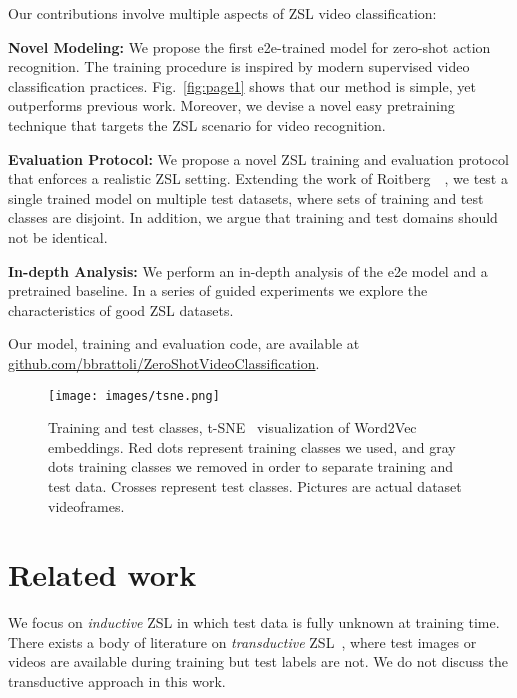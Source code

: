 \documentclass[10pt,twocolumn,letterpaper]{article}
\begin{document}
Our contributions involve multiple aspects of ZSL video classification:
\begin{compactenum}
  \item[\textbf{Novel Modeling:}] We propose the first e2e-trained model for zero-shot action recognition. The training procedure is inspired by modern supervised video classification practices. Fig.~\ref{fig:page1} shows that our method is simple, yet outperforms previous work. Moreover, we devise a novel easy pretraining technique that targets the ZSL scenario for video recognition.
  \item[\textbf{Evaluation Protocol:}] We propose a novel ZSL training and evaluation protocol that enforces a realistic ZSL setting. Extending the work of Roitberg~\etal~\cite{roitberg2018towards}, we test a single trained model on multiple test datasets, where sets of training and test classes are disjoint. In addition, we argue that training and test domains should not be identical.
  \item[\textbf{In-depth Analysis:}] We perform an in-depth analysis of the e2e model and a pretrained baseline. In a series of guided experiments we explore the characteristics of good ZSL datasets.
\end{compactenum}

Our model, training and evaluation code, are available at \textcolor{blue}{\href{https://github.com/bbrattoli/ZeroShotVideoClassification}{github.com/bbrattoli/ZeroShotVideoClassification}}.

\begin{figure}
\centering
\texttt{[image: images/tsne.png]}
\caption{Training and test classes, t-SNE~\cite{tsne} visualization of Word2Vec embeddings. Red dots represent training classes we used, and gray dots training classes we removed in order to separate training and test data. Crosses represent test classes. Pictures are actual dataset videoframes.}
\label{fig:tsne}
\end{figure}

\section{Related work}\label{sec:relatedwork}
We focus on \emph{inductive} ZSL in which test data is fully unknown at training time. There exists a body of literature on \emph{transductive} ZSL~\cite{alexiou2016exploring,mishra2018generative,wang2017alternative,wang2017zero,xu2017transductive,xu2015semantic,xu2016multi}, where test images or videos are available during training but test labels are not. We do not discuss the transductive approach in this work.
\end{document}
